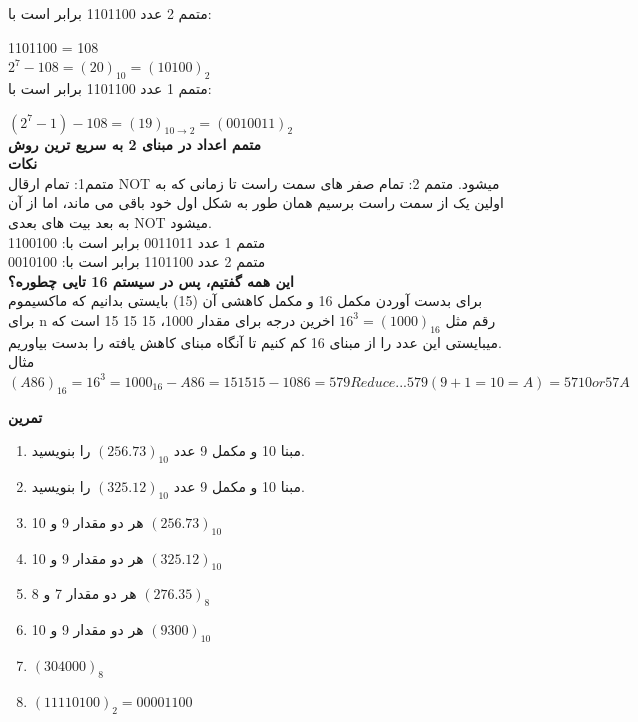 \documentclass[pt, a5paper]{article}
\begin{document}
متمم 2 عدد 1101100 برابر است با:\\
\raggedright
1101100 = 108\\
$2^{7} - 108 = (20)_{10} = (10100)_{2}$\\
\raggedleft
متمم 1 عدد 1101100 برابر است با:\\
\raggedright
$(2^{7} - 1) - 108 = (19)_{10 \rightarrow 2} = (0010011)_{2}$\\
\raggedleft
\textbf{متمم اعداد در مبنای 2 به سریع ترین روش}\\
\textbf{نکات}\\
متمم1: تمام ارقال NOT میشود.
متمم 2: تمام صفر های سمت راست تا زمانی که به اولین یک از سمت راست برسیم همان طور به شکل اول خود باقی می ماند، اما از آن به بعد بیت های بعدی NOT میشود.\\
متمم 1 عدد 0011011 برابر  است با: 1100100\\
متمم 2 عدد 1101100 برابر است با: 0010100\\

\textbf{این همه گفتیم، پس در سیستم 16 تایی چطوره؟}\\
برای بدست آوردن مکمل 16 و مکمل کاهشی آن (15) بایستی بدانیم که ماکسیموم برای n رقم مثل
$16^{3} = (1000)_{16}$
اخرین درجه برای مقدار 1000، 15 15 15 است که میبایستی این عدد را از  مبنای 16 کم کنیم تا آنگاه مبنای کاهش یافته را بدست بیاوریم.\\
مثال\\
\centering$(A86)_{16} = 16^{3} = 1000_{16} - A86 = 15 15 15 - 10 8 6 = 5 7 9 Reduce...579 (9+1=10=A)= 57 10 or 57A$

\textbf{تمرین}\\ \raggedleft

\begin{enumerate}\raggedleft
	\item
	مبنا 10 و مکمل 9 عدد
$(256.73)_{10}$
را بنویسید.\\

	\item
	
مبنا 10 و مکمل 9 عدد
$(325.12)_{10}$
را بنویسید.\\

	\item
	
هر دو مقدار 9 و 10
$(256.73)_{10}$\\
	\item
	
هر دو مقدار 9 و 10
$(325.12)_{10}$\\
	\item
	
هر دو مقدار 7 و 8
$(276.35)_{8}$\\

	\item
	
هر دو مقدار 9 و 10
$(9300)_{10}$\\
	\item
	
$(304000)_{8}$\\

	\item
	
$(11110100)_{2} = 00001100$\\
\end{enumerate}
\end{document}
